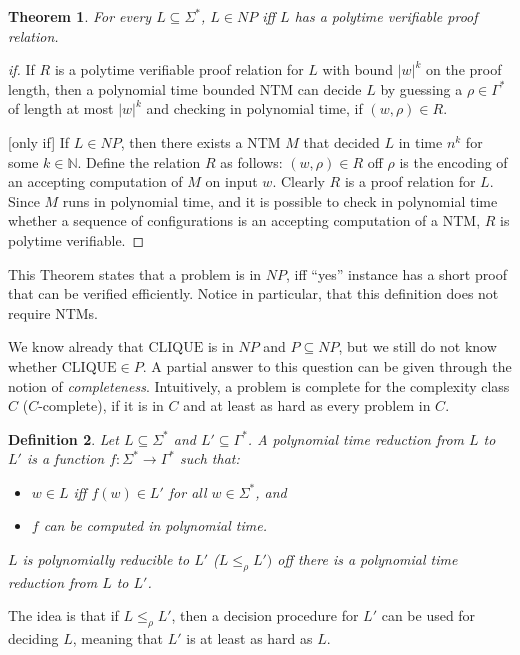 \documentclass{report}
\newtheorem{definition}{Definition}[chapter]
\newtheorem{theorem}[definition]{Theorem}
\begin{document}
\begin{theorem}For every $L\subseteq\Sigma^*$, $L\in NP$ iff $L$ has a polytime verifiable proof relation.
\end{theorem}

\begin{proof} [if] If $R$ is a polytime verifiable proof relation for $L$ with bound $|w|^k$ on the proof length,  then a polynomial time bounded NTM can decide $L$ by guessing a $\rho\in\Gamma^*$ of length at most $|w|^k$ and checking in polynomial time, if $(w,\rho)\in R$.

[only if] If $L\in NP$, then there exists a NTM $M$ that decided $L$ in time $n^k$ for some $k\in\mathbb{N}$. Define the relation $R$ as follows: $(w,\rho)\in R$ off $\rho$ is the encoding of an accepting computation of $M$ on input $w$. Clearly $R$ is a proof relation for $L$. Since $M$ runs in polynomial time, and it is possible to check in polynomial time whether a sequence of configurations is an accepting computation of a NTM, $R$ is polytime verifiable. 
\end{proof}

This Theorem states that a problem is in $NP$, iff ``yes'' instance has a short proof that can be verified efficiently. Notice in particular, that this definition does not require NTMs.

We know already that $\mathrm{CLIQUE}$ is in $NP$ and $P\subseteq NP$, but we still do not know whether $\mathrm{CLIQUE} \in P$. A partial answer to this question can be given through the notion of \textit{completeness}. Intuitively, a problem is complete for the complexity class $C$ ($C$-complete), if it is in $C$ and at least as hard as every problem in $C$.

\begin{definition}Let $L\subseteq\Sigma^*$ and $L'\subseteq\Gamma^*$. A polynomial time reduction from $L$ to $L'$ is a function $f:\Sigma^*\rightarrow\Gamma^*$ such that: 
\begin{itemize}
\item[-] $w\in  L$ iff $f(w)\in L'$ for all $w\in \Sigma^*$, and
\item[-] $f$ can be computed in polynomial time.
\end{itemize}
$L$ is polynomially reducible to $L'$ ($L\leq_\rho L')$ off there is a polynomial time reduction from $L$ to $L'$.
\end{definition}
The idea is that if $L\leq_\rho L'$, then a decision procedure for $L'$ can be used for deciding $L$, meaning that $L'$ is at least as hard as $L$.
\end{document}
